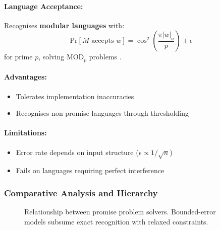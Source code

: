 \paragraph{Language Acceptance:}
Recognises \textbf{modular languages} with:
\[
\text{Pr}[M \text{ accepts } w] = \cos^2\left(\frac{\pi |w|_a}{p}\right) \pm \epsilon
\]
for prime $p$, solving MOD$_p$ problems \cite{ambainis2002quantum}.

\paragraph{Advantages:}
\begin{itemize}
    \item Tolerates implementation inaccuracies
    \item Recognises non-promise languages through thresholding
\end{itemize}

\paragraph{Limitations:}
\begin{itemize}
    \item Error rate depends on input structure ($\epsilon \propto 1/\sqrt{n}$)
    \item Fails on languages requiring perfect interference
\end{itemize}

\subsubsection*{Comparative Analysis and Hierarchy}
\begin{figure}[h]
\centering
{}
\caption{Relationship between promise problem solvers. Bounded-error models subsume exact recognition with relaxed constraints.}
\label{fig:promise-hierarchy}
\end{figure}

